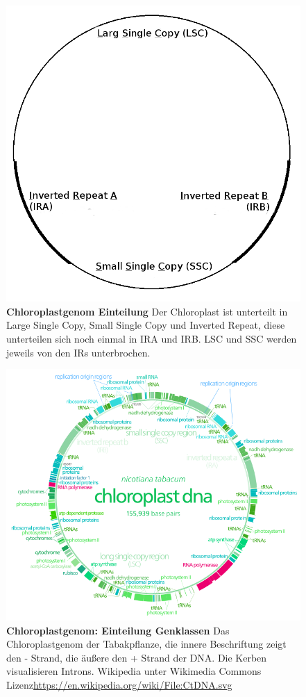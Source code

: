 \documentclass{scrartcl}
\begin{document}
\begin{figure}
\includegraphics[width=.9\linewidth]{./Chloroplast_1.png}
\caption[Chloroplastgenom Einteilung]{\textbf{Chloroplastgenom Einteilung} Der Chloroplast ist unterteilt in Large Single Copy, Small Single Copy und Inverted Repeat, diese unterteilen sich noch einmal in IRA und IRB. LSC und SSC werden jeweils von den IRs unterbrochen.}
\end{figure}

\begin{figure}
\includegraphics[width=.9\linewidth]{./703px-CtDNA.png}
\caption[Chloroplastgenom: Genklassen]{\textbf{Chloroplastgenom: Einteilung Genklassen} Das Chloroplastgenom der Tabakpflanze, die innere Beschriftung zeigt den - Strand, die äußere den + Strand der DNA. Die Kerben visualisieren Introns.   Wikipedia unter Wikimedia Commons Lizenz\url{https://en.wikipedia.org/wiki/File:CtDNA.svg}}
\end{figure}
\end{document}
